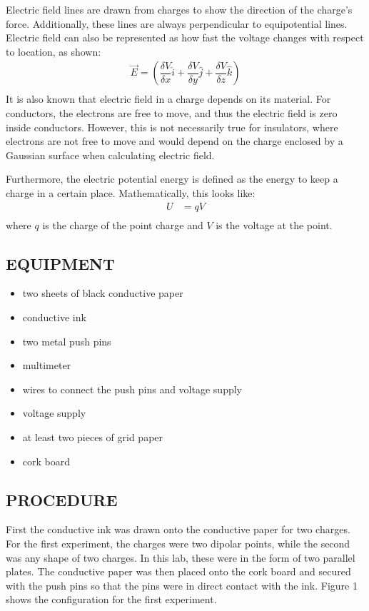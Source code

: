 \documentclass [12pt, letterpaper, twoside] {article}
\begin{document}
Electric field lines are drawn from charges to show the direction of the charge's force. Additionally, these lines are always perpendicular to equipotential lines.
Electric field can also be represented as how fast the voltage changes with respect to location, as shown:
\begin{equation}
  \begin{split}
    \vec{E} = \left(\dfrac{\delta{V}}{\delta{x}}\hat{i} + \dfrac{\delta{V}}{\delta{y}}\hat{j} + \dfrac{\delta{V}}{\delta{z}}\hat{k}\right) \\
  \end{split}
\end{equation}
It is also known that electric field in a charge depends on its material. For conductors, the electrons are free to move, and thus the electric field is zero inside conductors. However, this is not necessarily true for insulators, where electrons are not free to move and would depend on the charge enclosed by a Gaussian surface when calculating electric field.

Furthermore, the electric potential energy is defined as the energy to keep a charge in a certain place. Mathematically, this looks like:
\begin{equation}
  \begin{split}
    U &= qV \\
  \end{split}
\end{equation}
where \(q\) is the charge of the point charge and \(V\) is the voltage at the point.

\subsection* {EQUIPMENT}
  \noindent
  \begin {itemize}
    \itemsep0em
    \item {two sheets of black conductive paper}
    \item {conductive ink}
    \item {two metal push pins}
    \item {multimeter}
    \item {wires to connect the push pins and voltage supply}
    \item {voltage supply}
    \item {at least two pieces of grid paper}
    \item {cork board}
  \end {itemize}

\subsection* {PROCEDURE}
First the conductive ink was drawn onto the conductive paper for two charges. For the first experiment, the charges were two dipolar points, while the second was any shape of two charges. In this lab, these were in the form of two parallel plates. The conductive paper was then placed onto the cork board and secured with the push pins so that the pins were in direct contact with the ink. Figure 1 shows the configuration for the first experiment.
\end{document}
